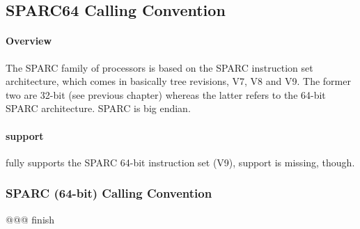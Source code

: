 %
%
%
%

\subsection{SPARC64 Calling Convention}

\paragraph{Overview}

The SPARC family of processors is based on the SPARC instruction set architecture, which comes in basically tree revisions,
V7, V8 and V9. The former two are 32-bit (see previous chapter) whereas the latter refers to the 64-bit SPARC architecture. SPARC is big endian.

\paragraph{ support}

 fully supports the SPARC 64-bit instruction set (V9),  support is missing, though.

\subsubsection{SPARC (64-bit) Calling Convention}

@@@ finish
